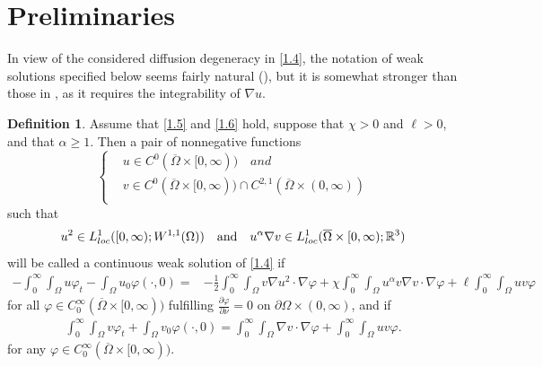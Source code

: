 \documentclass[12pt]{article}
\theoremstyle{plain}
\theoremstyle{definition}
\newtheorem{definition}{Definition}[section]
\numberwithin{equation}{section}
\begin{document}
\section{Preliminaries}\label{sec:preli}
In  view of the considered diffusion
degeneracy in \eqref{1.4}, the notation of  weak solutions  specified below seems  fairly natural (\cite{WJDE}), but it is somewhat
stronger  than those in \cite{LiG,WCVPDE}, as  it requires the integrability of $\nabla u$.


\begin{definition}\label{Definition 2.1} Assume  that \eqref{1.5} and \eqref{1.6} hold, suppose that $\chi >0$ and $\ell> 0$, and  that $\alpha\geq 1$. Then a pair of nonnegative functions
\begin{equation}\label{2.1}
\left\{
\begin{aligned}
&u\in C^{0}(\overline{\Omega}\times [0,\infty))\quad and \\
&v\in C^{0}(\overline{\Omega}\times [0,\infty))\cap C^{2,1}(\overline{\Omega}\times(0,\infty))\\
\end{aligned}
\right.
\end{equation}
such that
\begin{align}\label{2.2}
  u^2 \in L^{1}_{loc}([0,\infty); W^{1,1}(\Omega))\quad \hbox{and}\quad u^\alpha\nabla v \in L^{1}_{loc}(\overline{\Omega}\times
  [0,\infty);\mathbb{R}^3)
\end{align}
 will be called a continuous weak solution of \eqref{1.4} if
\begin{align}\label{2.3}
    -\int_{0}^{\infty}\!\int_{\Omega}u\varphi_t-\int_{\Omega}u_0\varphi(\cdot,0)=
    &-\frac{1}{2}\int_{0}^{\infty} \!\int_{\Omega}
     v \nabla u^2 \cdot\nabla\varphi %
     +\chi\int_{0}^{\infty}\!\int_{\Omega}u^{\alpha}v\nabla v\cdot \nabla \varphi
     +\ell\int_{0}^{\infty}\!\int_{\Omega}uv\varphi
\end{align}
for all
 $\varphi \in C_0^{\infty}(\overline{\Omega}\times [0,\infty))$
 fulfilling $\frac{\partial \varphi}{\partial \nu}=0$ on $\partial\Omega\times(0,\infty)$, and if
\begin{align}\label{2.4}
\int_{0}^{\infty}\int_{\Omega}v\varphi_t+\int_{\Omega}v_0\varphi(\cdot,0)=\int_{0}^{\infty}\int_{\Omega}\nabla
v\cdot\nabla\varphi+\int_{0}^{\infty}\int_{\Omega}uv\varphi.
\end{align}
for any $\varphi \in C_0^{\infty}(\overline{\Omega}\times [0,\infty))$.
\end{definition}
\end{document}
